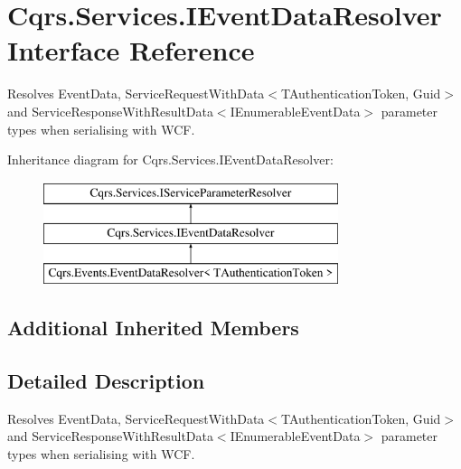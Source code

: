 \hypertarget{interfaceCqrs_1_1Services_1_1IEventDataResolver}{}\section{Cqrs.\+Services.\+I\+Event\+Data\+Resolver Interface Reference}
\label{interfaceCqrs_1_1Services_1_1IEventDataResolver}


Resolves Event\+Data, Service\+Request\+With\+Data$<$\+T\+Authentication\+Token, Guid$>$ and Service\+Response\+With\+Result\+Data$<$\+I\+Enumerable\+Event\+Data$>$ parameter types when serialising with W\+CF.  


Inheritance diagram for Cqrs.\+Services.\+I\+Event\+Data\+Resolver\+:\begin{figure}[H]
\begin{center}
\leavevmode
\includegraphics[height=3.000000cm]{interfaceCqrs_1_1Services_1_1IEventDataResolver}
\end{center}
\end{figure}
\subsection*{Additional Inherited Members}


\subsection{Detailed Description}
Resolves Event\+Data, Service\+Request\+With\+Data$<$\+T\+Authentication\+Token, Guid$>$ and Service\+Response\+With\+Result\+Data$<$\+I\+Enumerable\+Event\+Data$>$ parameter types when serialising with W\+CF. 

